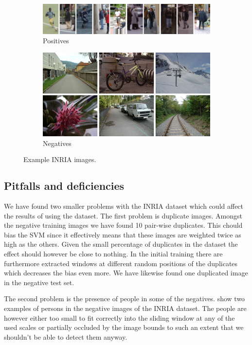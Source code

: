 \documentclass[thesis.tex]{subfiles}
\begin{document}
\begin{figure}
	\centering
	\begin{subfigure}[t]{\textwidth}
		\includegraphics[width=\textwidth]{img/inriaPositives.png}
		\caption{Positives}
		\label{fig:inriaPositives}
		\vspace{2mm}
	\end{subfigure}
	\begin{subfigure}[t]{\textwidth}
		\includegraphics[width=\textwidth]{img/inriaNegatives.png}
		\caption{Negatives}
		\label{fig:inriaNegatives}
	\end{subfigure}
	\caption{Example INRIA images.}
	\label{fig:inriaExampleImages}
\end{figure}

\subsection{Pitfalls and deficiencies}
We have found two smaller problems with the INRIA dataset which could affect the results of using the dataset. The first problem is duplicate images. Amongst the negative training images we have found 10 pair-wise duplicates. This chould bias the SVM since it effectively means that these images are weighted twice as high as the others. Given the small percentage of duplicates in the dataset the effect should however be close to nothing. In the initial training there are furthermore extracted windows at different random positions of the duplicates which decreases the bias even more. We have likewise found one duplicated image in the negative test set.

The second problem is the presence of people in some of the negatives.
 show two examples of persons in the negative images of the INRIA dataset. The people are however either too small to fit correctly into the sliding window at any of the used scales or partially occluded by the image bounds to such an extent that we shouldn't be able to detect them anyway.
\end{document}
